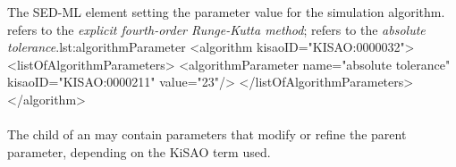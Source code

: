 \begin{myXmlLst}{The SED-ML  element setting the parameter value for the simulation algorithm.  refers to the \emph{explicit fourth-order Runge-Kutta method};  refers to the \emph{absolute tolerance}.}{lst:algorithmParameter}
<algorithm kisaoID="KISAO:0000032"> 
	<listOfAlgorithmParameters> 
		<algorithmParameter name="absolute tolerance" kisaoID="KISAO:0000211" value="23"/> 
	</listOfAlgorithmParameters>
</algorithm>
\end{myXmlLst}

\paragraph*{}
The child  of an \AlgorithmParameter may contain parameters that modify or refine the parent parameter, depending on the KiSAO term used.  

